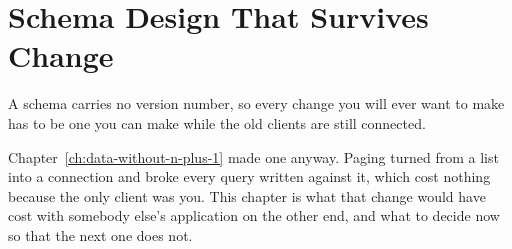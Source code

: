 \chapter{Schema Design That Survives Change}
\label{ch:schema-design}

A schema carries no version number, so every change you will ever want to make
has to be one you can make while the old clients are still connected.

Chapter~\ref{ch:data-without-n-plus-1} made one anyway. Paging turned
 from a list into a connection and broke every query written
against it, which cost nothing because the only client was you. This chapter
is what that change would have cost with somebody else's application on the
other end, and what to decide now so that the next one does not.







